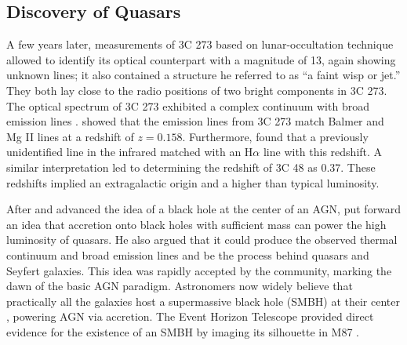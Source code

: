 \subsection{Discovery of Quasars}
A few years later, measurements of 3C 273 based on lunar-occultation technique allowed  \citet{schmidt19633c} to identify its optical counterpart with a magnitude of 13, again showing unknown lines; it also contained a structure he referred to as ``a faint wisp or jet.'' They both lay close to the radio positions of two bright components in 3C 273. The optical spectrum of  3C 273 exhibited a complex continuum with broad emission lines \citep{oke1963absolute}.
\citet{schmidt19633c} showed that the emission lines from 3C 273 match Balmer and Mg II lines at a redshift of $z=0.158$. Furthermore, \citep{oke1963absolute} found that a previously unidentified line in the infrared matched with an H$\alpha$ line with this redshift. A similar interpretation led to determining the redshift of 3C 48 as 0.37. These redshifts implied an extragalactic origin and a higher than typical luminosity.

After \citet{salpeter1964accretion} and \citet{zel1964estimating} advanced the idea of a black hole at the center of an AGN, \citet{lynden1969galactic} put forward an idea that accretion onto black holes with sufficient mass can power the high luminosity of quasars. He also argued that it could produce the observed thermal continuum and broad emission lines and be the process behind quasars and Seyfert galaxies. This idea was rapidly accepted by the community, marking the dawn of the basic AGN paradigm. Astronomers now widely believe that practically all the galaxies host a supermassive black hole (SMBH) at their center \citep[e.g.,][]{richstone1998supermassive}, powering AGN via accretion. The Event Horizon Telescope provided direct evidence for the existence of an SMBH by imaging its silhouette in M87 \citep{2019ApJ...875L...1E}.

